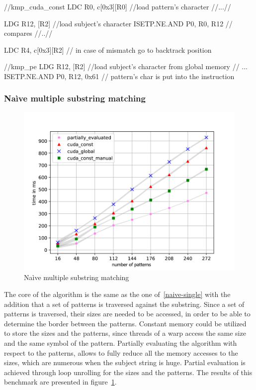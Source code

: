 \begin{listing}
\begin{pyglist}[language=C,caption=KMP partial evaluation,label=code:kmp_spec]
    //kmp_cuda_const
LDC R0, c[0x3][R0] //load pattern's character
    //...//
    
LDG R12, [R2] //load subject's character
ISETP.NE.AND P0, R0, R12 // compares
    //..//

LDC R4, c[0x3][R2] // in case of mismatch go to backtrack position

    //kmp_pe
LDG R12, [R2] //load subject's character from global memory
    //    ...
ISETP.NE.AND P0, R12, 0x61 // pattern's char is put into the instruction
\end{pyglist}
\end{listing}

\subsubsection{Na\`ive multiple substring matching}\label{nmsm}

\begin{figure}
    \centering
    \includegraphics[width=0.85\linewidth]{figures/PredDefendNaiveSearch.pdf}
    \caption{Na\`ive multiple substring matching}
    \label{fig:naive_multy}
\end{figure}

The core of the algorithm is the same as the one of~\ref{naive-single} with the addition that a set of patterns is traversed against the substring. Since a set of patterns is traversed, their sizes are needed to be accessed, in order to be able to determine the border between the patterns. Constant memory could be utilized to store the sizes and the patterns, since threads of a warp access the same size and the same symbol of the pattern. Partially evaluating the algorithm with respect to the patterns, allows to fully reduce all the memory accesses to the sizes, which are numerous when the subject string is huge. Partial evaluation is achieved through loop unrolling for the sizes and the patterns. The results of this benchmark are presented in figure~\ref{fig:naive_multy}.

